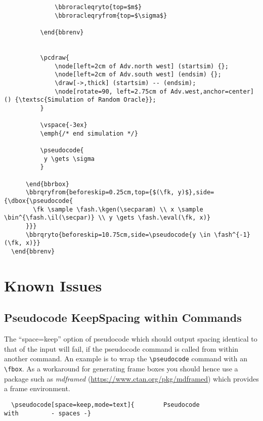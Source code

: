 \documentclass[a4paper]{report}
\begin{document}
\begin{lstlisting}
			  \bbroracleqryto{top=$m$}
			  \bbroracleqryfrom{top=$\sigma$}			
  
		  \end{bbrenv}
		  
	  
		  \pcdraw{
			  \node[left=2cm of Adv.north west] (startsim) {};
			  \node[left=2cm of Adv.south west] (endsim) {};			
			  \draw[->,thick] (startsim) -- (endsim);
			  \node[rotate=90, left=2.75cm of Adv.west,anchor=center] () {\textsc{Simulation of Random Oracle}};
		  }
		  
		  \vspace{-3ex}
		  \emph{/* end simulation */}
		  
		  \pseudocode{
		   y \gets \sigma
		  }
  
	  \end{bbrbox}
	  \bbrqryfrom{beforeskip=0.25cm,top={$(\fk, y)$},side={\dbox{\pseudocode{
		\fk \sample \fash.\kgen(\secparam) \\ x \sample \bin^{\fash.\il(\secpar)} \\ y \gets \fash.\eval(\fk, x)} 
	  }}}
	  \bbrqryto{beforeskip=10.75cm,side=\pseudocode{y \in \fash^{-1}(\fk, x)}}
  \end{bbrenv}
  \end{lstlisting}
  
  
  \chapter{Known Issues}
  
  \section{Pseudocode KeepSpacing within Commands}
  \label{sec:keepindent-problem}
  The \enquote{space=keep} option of pseudocode which should output spacing identical to that of the input 
  will fail, if the pseudocode command is called from within another command. An example is to
  wrap the \lstinline$\pseudocode$ command with an \lstinline$\fbox$. As a workaround for generating frame boxes you should hence
  use a package such as \emph{mdframed} (\url{https://www.ctan.org/pkg/mdframed}) which provides a frame environment.
  
  \begin{mdframed}
  \end{mdframed}
  \begin{lstlisting}
  \pseudocode[space=keep,mode=text]{        Pseudocode                with         - spaces -}
  \end{lstlisting}
  
\end{document}
